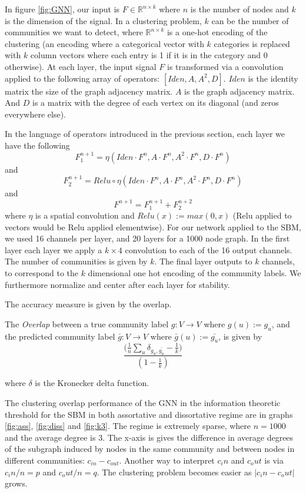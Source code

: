 In figure \ref{fig:GNN}, our input is $F\in \mathbb{R}^{n \times k}$ where $n$ is the number of nodes and $k$ is the dimension of the signal.  In a clustering problem, $k$ can be the number of communities we want to detect, where $\mathbb{R}^{n\times k}$ is a one-hot encoding of the clustering (an encoding where a categorical vector with $k$ categories is replaced with $k$ column vectors where each entry is 1 if it is in the category and 0 otherwise). At each layer, the input signal $F$ is transformed via a convolution applied to the following array of operators:  $[Iden, A, A^2, D]$.  $Iden$ is the identity matrix the size of the graph adjacency matrix.  $A$ is the graph adjacency matrix.  And $D$ is a matrix with the degree of each vertex on its diagonal (and zeros everywhere else). 

In the language of operators introduced in the previous section, each layer we have the following $$ F_1^{n+1} = \eta(Iden \cdot F^n, A \cdot F^n, A^2 \cdot F^n, D \cdot F^n)$$ and $$ F_2^{n+1} = Relu \circ \eta(Iden \cdot F^n, A \cdot F^n, A^2 \cdot F^n, D \cdot F^n)$$ and $$ F^{n+1} = F_1^{n+1}+F_2^{n+2}$$
where $\eta$ is a spatial convolution and $Relu(x) := max(0, x)$ (Relu applied to vectors would be Relu applied elementwise).  For our network applied to the SBM, we used 16 channels per layer, and 20 layers for a 1000 node graph. In the first layer each layer we apply a $k \times 4$ convolution to each of the 16 output channels.  The number of communities is given by $k$.  The final layer outputs to $k$ channels, to correspond to the $k$ dimensional one hot encoding of the community labels. We furthermore normalize and center after each layer for stability.  

The accuracy measure is given by the overlap. 
\begin{definition}The \textit{Overlap} between a true community label $g: V \rightarrow V$ where $g(u) := g_u$, and the predicted community label $\bar{g}:V \rightarrow V$ where $\bar{g}(u) := \bar{g_u}$, is given by
$$ \frac{\big(\frac{1}{n}\sum_u \delta_{g_u, \bar{g_u}} - \frac{1}{k}\big)}{(1-\frac{1}{k})}$$

where $\delta$ is the Kronecker delta function.  
\end{definition}

The clustering overlap performance of the GNN in the information theoretic threshold for the SBM in both assortative and dissortative regime are in graphs \ref{fig:ass}, \ref{fig:diss} and \ref{fig:k3}.  The regime is extremely sparse, where $n =1000$ and the average degree is $3$.  The x-axis is gives the difference in average degrees of the subgraph induced by nodes in the same community and between nodes in different communities: $c_{in} - c_{out}$.  Another way to interpret $c_in$ and $c_out$ is via $c_in/n = p$ and $c_out/n = q$.  The clustering problem becomes easier as $|c_in-c_out|$ grows.  

